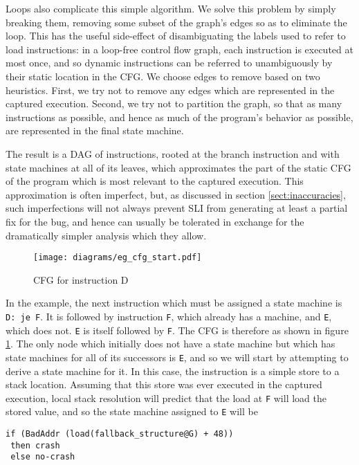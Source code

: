 \documentclass[10pt,twocolumn,preprint,natbib,authoryear]{sigplanconf}
\begin{document}
Loops also complicate this simple algorithm.  We solve this problem by
simply breaking them, removing some subset of the graph's edges so as
to eliminate the loop.  This has the useful side-effect of
disambiguating the labels used to refer to load instructions: in a
loop-free control flow graph, each instruction is executed at most
once, and so dynamic instructions can be referred to unambiguously by
their static location in the CFG.  We choose edges to remove based on
two heuristics.  First, we try not to remove any edges which are
represented in the captured execution.  Second, we try not to
partition the graph, so that as many instructions as possible, and
hence as much of the program's behavior as possible, are represented
in the final state machine.

The result is a DAG of instructions, rooted at the branch instruction
and with state machines at all of its leaves, which approximates the
part of the static CFG of the program which is most relevant to the
captured execution.  This approximation is often imperfect, but, as
discussed in section \ref{sect:inaccuracies}, such imperfections will
not always prevent SLI from generating at least a partial fix for the
bug, and hence can usually be tolerated in exchange for the
dramatically simpler analysis which they allow.

\begin{figure}
\texttt{[image: diagrams/eg\_cfg\_start.pdf]}
\caption{CFG for instruction D}
\label{fig:eg_cfg}
\end{figure}

In the example, the next instruction which must be assigned a state
machine is \verb|D: je F|.  It is followed by instruction \verb|F|,
which already has a machine, and \verb|E|, which does not.  \verb|E|
is itself followed by \verb|F|.  The CFG is therefore as shown in
figure \ref{fig:eg_cfg}.  The only node which initially does not have
a state machine but which has state machines for all of its successors
is \verb|E|, and so we will start by attempting to derive a state
machine for it.  In this case, the instruction is a simple store to a
stack location.  Assuming that this store was ever executed in the
captured execution, local stack resolution will predict that the load
at \verb|F| will load the stored value, and so the state machine
assigned to \verb|E| will be

\begin{verbatim}
if (BadAddr (load(fallback_structure@G) + 48))
 then crash
 else no-crash
\end{verbatim}
\end{document}
